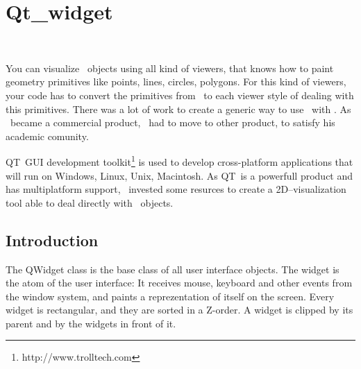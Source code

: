
\newcommand{\qt}{{\sc QT}}	%

\gdef\lciIfHtmlClassLinks{\lcFalse}
\gdef\lciIfHtmlRefLinks{\lcFalse}
\gdef\lciIfHtmlLinks{\lcFalse}

\chapter{Qt\_widget}
\label{chapterQtwidget}

\\

You can visualize \cgal\ objects using all kind of viewers, that knows how to
 paint geometry primitives like points, lines, circles, polygons. For this
kind of viewers, your code has to convert the primitives from \cgal\ to each 
viewer style of dealing with this primitives. There was a lot of work to 
create a generic way to use \cgal\ with \leda. As \leda\ became a commercial 
product, \cgal\ had to move to other product, to satisfy his academic 
comunity.

\qt\ GUI development toolkit\footnote{http://www.trolltech.com} is used to 
develop cross-platform applications that will run on Windows, Linux, Unix, 
Macintosh. As \qt\ is a powerfull product and has multiplatform support, 
\cgal\ invested some resurces to create a 2D--visualization tool able to 
deal directly with \cgal\ objects.

\section{Introduction}
\label{sectionIntroduction}

The QWidget class is the base class of all user interface objects. The widget
 is the atom of the user interface: It receives mouse, keyboard and other 
events from the window system, and paints a reprezentation of itself on the 
screen. Every widget is rectangular, and they are sorted in a Z-order. A 
widget is clipped by its parent and by the widgets in front of it.

